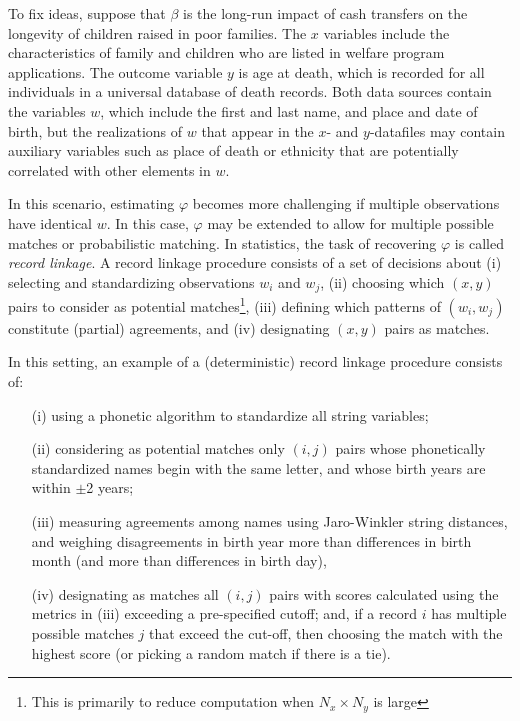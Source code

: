 \documentclass[12pt]{article}
\begin{document}
To fix ideas, suppose that $\beta$ is the long-run impact of cash transfers on the longevity of children raised in poor families.  The $x$ variables include the characteristics of family and children who are listed in welfare program applications.  The outcome variable $y$ is age at death, which is recorded for all individuals in a universal database of death records.  Both data sources contain the variables $w$, which include the first and last name, and place and date of birth, but the realizations of $w$ that appear in the $x$- and $y$-datafiles may contain auxiliary variables such as place of death or ethnicity that are potentially correlated with other elements in $w$.

In this scenario, estimating $\varphi$ becomes more challenging if multiple observations have identical $w$.  In this case, $\varphi$ may be extended to allow for multiple possible matches or probabilistic matching.  In statistics, the task of recovering $\varphi$ is called \textit{record linkage}.  A record linkage procedure consists of a set of decisions about (i) selecting and standardizing observations $w_i$ and $w_j$, (ii) choosing which $(x,y)$ pairs to consider as potential matches\footnote{This is primarily to reduce computation when $N_x \times N_y$ is large}, (iii) defining which patterns of $(w_i,w_j)$ constitute (partial) agreements, and (iv) designating $(x,y)$ pairs as matches.



In this setting, an example of a (deterministic) record linkage procedure consists of: 
\begin{enumerate}
\item[(i)] using a phonetic algorithm to standardize all string variables; 
\item[(ii)] considering as potential matches only $(i,j)$ pairs whose phonetically standardized names begin with the same letter, and whose birth years are within $\pm$2 years;
\item[(iii)] measuring agreements among names using Jaro-Winkler string distances, and weighing disagreements in birth year more than differences in birth month (and more than differences in birth day), 
\item[(iv)] designating as matches all $(i,j)$ pairs with scores calculated using the metrics in (iii) exceeding a pre-specified cutoff; and, if a record $i$ has multiple possible matches $j$ that exceed the cut-off, then choosing the match with the highest score (or picking a random match if there is a tie).  
\end{enumerate}
\end{document}
